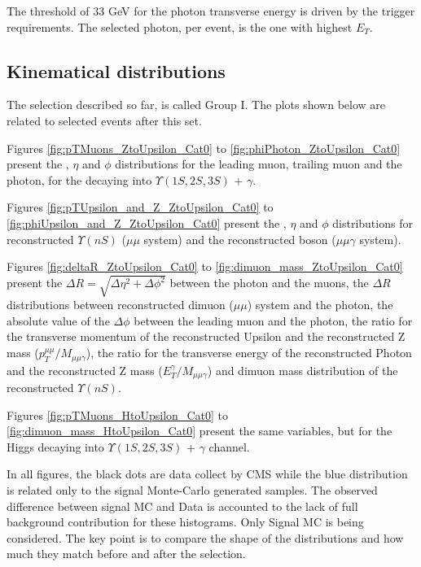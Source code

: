The threshold of 33 GeV for the photon transverse energy is driven by the trigger requirements. The selected photon, per event, is the one with highest $E_{T}$.


\subsection{Kinematical distributions}
\label{sec:kin_plots_group_1}

The selection described so far, is called Group I. The plots shown below are related to selected events after this set. 

Figures \ref{fig:pTMuons_ZtoUpsilon_Cat0} to \ref{fig:phiPhoton_ZtoUpsilon_Cat0} present the \PT, $\eta$ and $\phi$ distributions for the leading muon, trailing muon and the photon, for the \Z decaying into $\Upsilon(1S,2S,3S)$ + $\gamma$. 

Figures \ref{fig:pTUpsilon_and_Z_ZtoUpsilon_Cat0} to \ref{fig:phiUpsilon_and_Z_ZtoUpsilon_Cat0} present the \PT, $\eta$ and $\phi$ distributions for reconstructed $\Upsilon(nS)$ ($\mu\mu$ system) and the reconstructed boson ($\mu\mu\gamma$ system).

Figures \ref{fig:deltaR_ZtoUpsilon_Cat0} to \ref{fig:dimuon_mass_ZtoUpsilon_Cat0} present the $\Delta R = \sqrt{\Delta\eta^2 + \Delta\phi^2}$ between the photon and the muons, the $\Delta R$ distributions between reconstructed dimuon ($\mu\mu$) system and the photon, the absolute value of the $\Delta \phi$ between the leading muon and the photon, the ratio for the transverse momentum of the reconstructed Upsilon and the reconstructed Z mass ($p_{T}^{\mu\mu}/M_{\mu\mu\gamma}$), the ratio for the transverse energy of the reconstructed Photon and the reconstructed Z mass ($E_{T}^{\gamma}/M_{\mu\mu\gamma}$) and dimuon mass distribution of the reconstructed $\Upsilon(nS)$.

Figures \ref{fig:pTMuons_HtoUpsilon_Cat0} to \ref{fig:dimuon_mass_HtoUpsilon_Cat0} present the same variables, but for the Higgs decaying into $\Upsilon(1S,2S,3S)$ + $\gamma$ channel.

In all figures, the black dots are data collect by CMS while the blue distribution is related only to the signal Monte-Carlo generated samples. The observed difference between signal MC and Data is accounted to the lack of full background contribution for these histograms. Only Signal MC is being considered. The key point is to compare the shape of the distributions and how much they match before and after the selection.

